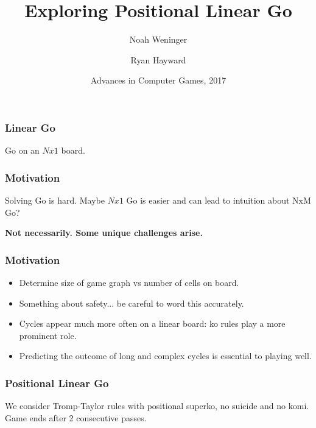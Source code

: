 \documentclass{beamer}
\title{Exploring Positional Linear Go}
\author[Weninger, Hayward]
{Noah Weninger \and Ryan Hayward}
\institute[University of Alberta]
{
  Department of Computing Science\\
  University of Alberta\\
  Canada
}
\date[ACG 2017]
{Advances in Computer Games, 2017}
\begin{document}
    \frame{\titlepage}

    \begin{frame}
        \frametitle{Linear Go}
        Go on an $Nx1$ board.
        \bigskip
        \begin{center}
            \cleargoban
            \showgoban[b2,j2]
        \end{center}
    \end{frame}

    \begin{frame}
        \frametitle{Motivation}
        Solving Go is hard. Maybe $Nx1$ Go is easier and can lead to intuition about NxM Go?
        \begin{center}
            \textbf{Not necessarily. Some unique challenges arise.}
        \end{center}
    \end{frame}
    \begin{frame}
        \frametitle{Motivation}
        \begin{itemize}[<+->]
            \item Determine size of game graph vs number of cells on board.
            \item Something about safety... be careful to word this accurately.
            \item Cycles appear much more often on a linear board: ko rules play a more prominent role.
            \item Predicting the outcome of long and complex cycles is essential to playing well.
        \end{itemize}
    \end{frame}

    \begin{frame}
        \frametitle{Positional Linear Go}
        We consider Tromp-Taylor rules with positional superko, no suicide and no komi. Game ends after 2 consecutive passes.
        \bigskip
        \begin{center}
            \cleargoban
            \showgoban[b2,h2]\\\medskip
            \pause
            \showgoban[b2,h2]\\\medskip
            \pause
            \showgoban[b2,h2]\\\medskip
            \pause
            \showgoban[b2,h2]\\\medskip
            \pause
            \showgoban[b2,h2]\\\medskip
            \pause
            \showgoban[b2,h2]\\\medskip
            \pause
            \showgoban[b2,h2]\\\medskip
            \pause
            \showgoban[b2,h2]\\\medskip
        \end{center}
    \end{frame}
\end{document}
